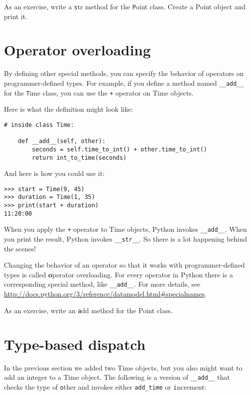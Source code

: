 \documentclass[
DIV=11,
fontsize=12,
twoside,
headinclude=false,
titlepage=firstiscover,
abstract=true,
headsepline=true,
footsepline=true,
chapterprefix=true, %
headings=big,
bibliography=totoc,%
captions=tableheading
]{scrbook}
\theoremstyle{definition}
\begin{document}
As an exercise, write a {\texttt str} method for the {\texttt Point} class.
Create a Point object and print it.


\section{Operator overloading}
\label{operator.overloading}

By defining other special methods, you can specify the behavior
of operators on programmer-defined types.  For example, if you define
a method named \verb"__add__" for the {\texttt Time} class, you can use the
{\texttt +} operator on Time objects.

Here is what the definition might look like:

\begin{lstlisting}
# inside class Time:

    def __add__(self, other):
        seconds = self.time_to_int() + other.time_to_int()
        return int_to_time(seconds)
\end{lstlisting}
%
And here is how you could use it:

\begin{lstlisting}
>>> start = Time(9, 45)
>>> duration = Time(1, 35)
>>> print(start + duration)
11:20:00
\end{lstlisting}
%
When you apply the {\texttt +} operator to Time objects, Python invokes
\verb"__add__".  When you print the result, Python invokes 
\verb"__str__".  So there is a lot happening behind the scenes!

Changing the behavior of an operator so that it works with
programmer-defined types is called {\textbf operator overloading}.  For every
operator in Python there is a corresponding special method, like 
\verb"__add__".  For more details, see
\url{http://docs.python.org/3/reference/datamodel.html#specialnames}.

As an exercise, write an {\texttt add} method for the Point class.  


\section{Type-based dispatch}

In the previous section we added two Time objects, but you
also might want to add an integer to a Time object.  The
following is a version of \verb"__add__"
that checks the type of {\texttt other} and invokes either
\verb"add_time" or {\texttt increment}:
\end{document}
